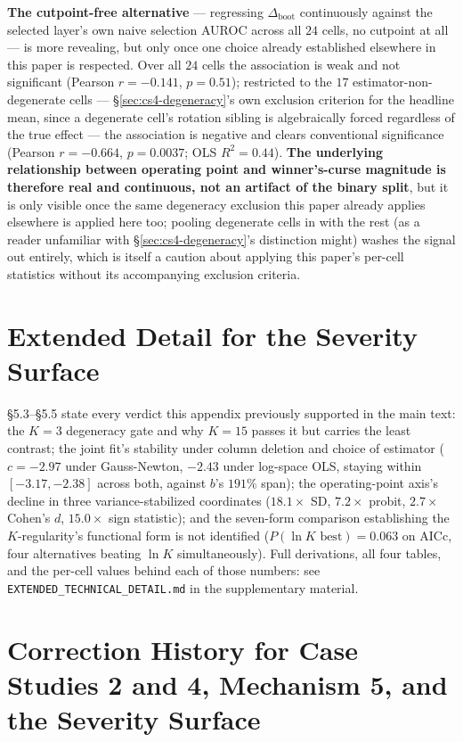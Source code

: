 \documentclass[10pt]{article} %
\begin{document}
\textbf{The cutpoint-free alternative} --- regressing $\Delta_{\text{boot}}$
continuously against the selected layer's own naive selection AUROC across
all $24$ cells, no cutpoint at all --- is more revealing, but only once one
choice already established elsewhere in this paper is respected. Over all
$24$ cells the association is weak and not significant (Pearson
$r=-0.141$, $p=0.51$); restricted to the $17$ estimator-non-degenerate cells
--- \S\ref{sec:cs4-degeneracy}'s own exclusion criterion for the headline mean,
since a degenerate cell's rotation sibling is algebraically forced regardless
of the true effect --- the association is negative and clears conventional
significance (Pearson $r=-0.664$, $p=0.0037$; OLS $R^2=0.44$). \textbf{The
underlying relationship between operating point and winner's-curse magnitude
is therefore real and continuous, not an artifact of the binary split}, but
it is only visible once the same degeneracy exclusion this paper already
applies elsewhere is applied here too; pooling degenerate cells in with the
rest (as a reader unfamiliar with \S\ref{sec:cs4-degeneracy}'s distinction
might) washes the signal out entirely, which is itself a caution about
applying this paper's per-cell statistics without its accompanying exclusion
criteria.

\section{Extended Detail for the Severity Surface}
\label{app:severity-detail}

§5.3--§5.5 state every verdict this appendix previously supported in the main
text: the $K=3$ degeneracy gate and why $K=15$ passes it but carries the least
contrast; the joint fit's stability under column deletion and choice of
estimator ($c=-2.97$ under Gauss-Newton, $-2.43$ under log-space OLS, staying
within $[-3.17,-2.38]$ across both, against $b$'s $191\%$ span); the
operating-point axis's decline in three variance-stabilized coordinates
($18.1\times$ SD, $7.2\times$ probit, $2.7\times$ Cohen's $d$, $15.0\times$
sign statistic); and the seven-form comparison establishing the $K$-regularity's
functional form is not identified ($P(\ln K\text{ best})=0.063$ on AICc, four
alternatives beating $\ln K$ simultaneously). Full derivations, all four
tables, and the per-cell values behind each of those numbers: see
\texttt{EXTENDED\_TECHNICAL\_DETAIL.md} in the supplementary material.

\section{Correction History for Case Studies 2 and 4, Mechanism 5, and the Severity Surface}
\label{app:corrections-global}
\end{document}
